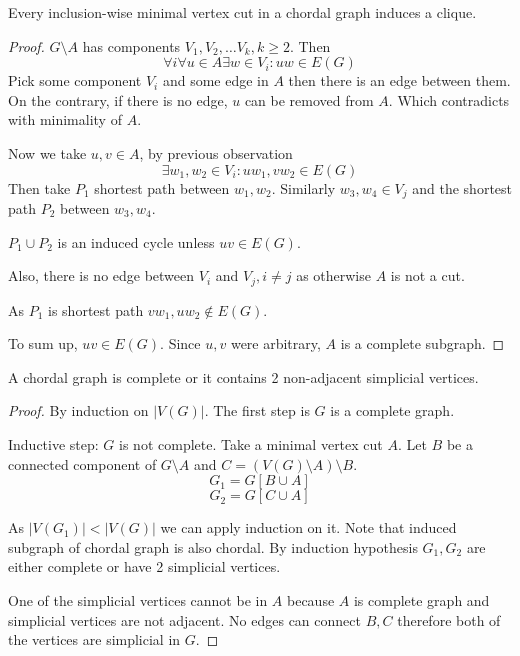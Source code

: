 \begin{lemma}[1]
	Every inclusion-wise minimal vertex cut in a chordal graph induces a clique.
\end{lemma}
\begin{proof}
	$G\setminus A$ has components $V_1, V_2, \ldots V_k, k \geq 2$.
	Then
	\[ \forall i \forall u \in A \exists w \in V_i: uw \in E(G) \]
	Pick some component $V_i$ and some edge in $A$ then there is an edge between them.
	On the contrary, if there is no edge, $u$ can be removed from $A$.
	Which contradicts with minimality of $A$.

	Now we take $u, v \in A$, by previous observation
	\[ \exists w_1, w_2 \in V_i: uw_1, vw_2 \in E(G) \]
	Then take $P_1$ shortest path between $w_1, w_2$.
	Similarly $w_3, w_4 \in V_j$ and the shortest path $P_2$ between $w_3, w_4$.

	$P_1 \cup P_2$ is an induced cycle unless $uv \in E(G)$.

	Also, there is no edge between $V_i$ and $V_j, i \ne j$ as otherwise $A$ is not a cut.

	As $P_1$ is shortest path $vw_1, uw_2 \notin E(G)$.

	To sum up, $uv \in E(G)$.
	Since $u,v$ were arbitrary, $A$ is a complete subgraph.
\end{proof}

\begin{lemma}[2]\label{chordal_lemma_2}
	A chordal graph is complete or it contains 2 non-adjacent simplicial vertices.
\end{lemma}
\begin{proof}
	By induction on $|V(G)|$.
	The first step is $G$ is a complete graph.

	Inductive step: $G$ is not complete.
	Take a minimal vertex cut $A$.
	Let $B$ be a connected component of $G\setminus A$ and $C = (V(G) \setminus A) \setminus B$.
	\[ G_1 = G[B \cup A] \]
	\[ G_2 = G[C \cup A] \]


	As $|V(G_1)| < |V(G)|$ we can apply induction on it.
	Note that induced subgraph of chordal graph is also chordal.
	By induction hypothesis $G_1, G_2$ are either complete or have 2 simplicial vertices.

	One of the simplicial vertices cannot be in $A$ because $A$ is complete graph and simplicial vertices are not adjacent.
	No edges can connect $B, C$ therefore both of the vertices are simplicial in $G$.
\end{proof}

